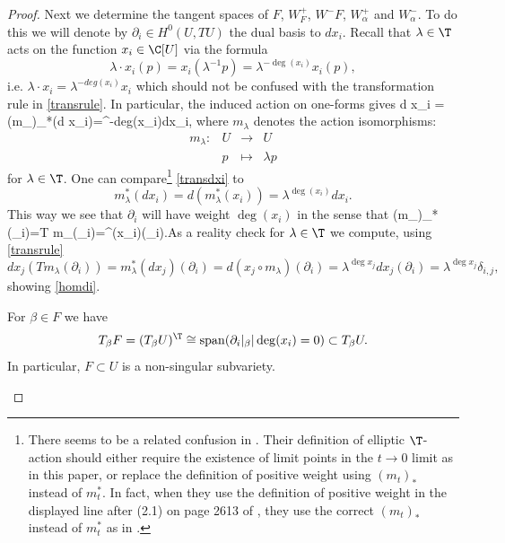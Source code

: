 \begin{proof}
	Next we determine the tangent spaces of $F$, $W^+_{F}$, $W^-{F}$, $W^+_\alpha$ and $W^-_\alpha$. To do this we will denote by $\partial_i\in H^0(U,TU)$ the dual basis to $dx_i$. Recall that  $\lambda\in \T$ acts on the function $x_i\in\C[U]$ via the formula $$\lambda\cdot x_i(p)=x_i( \lambda^{-1}p)=\lambda^{-\deg(x_i)}x_i(p),$$ i.e. $\lambda\cdot x_i=\lambda^{-deg(x_i)}x_i$ which should not be confused with the transformation rule in \eqref{transrule}.  In particular, the induced action on one-forms gives \beq\label{transdxi} \lambda\cdot d x_i =(m_\lambda)_*(d x_i)=\lambda^{-deg(x_i)}dx_i, \eeq where $m_\lambda$ denotes the action isomorphisms:  $$\begin{array}{cccc}m_\lambda: &U&\to& U\\ &p&\mapsto& \lambda p\end{array}$$ for $\lambda\in \T$. One can compare\footnote{There seems to be a related confusion in \cite[Definition 1.1]{bellamy-etal}. Their  definition of elliptic $\T$-action  should either require the existence of limit points in the $t\to 0$ limit as in this paper, or replace the definition of positive weight using $(m_t)_*$ instead of $m_t^*$. In fact, when they use the definition of positive weight in the displayed line after (2.1) on page 2613 of \cite{bellamy-etal}, they use the correct $(m_t)_*$ instead of $m_t^*$ as in   \cite[Definition 1.1]{bellamy-etal}. } \eqref{transdxi} to $$m_\lambda^*(dx_i)=d(m_\lambda^*(x_i))=\lambda^{\deg(x_i)}dx_i .$$  This way we see that $\partial_i$ will have weight $\deg(x_i)$ in the sense that \beq\label{homdi} (m_\lambda)_*(\partial_i)=T m_\lambda(\partial_i)=\lambda^{\deg(x_i)}(\partial_i).\eeq  As a reality check for $\lambda\in \T$  we compute, using \eqref{transrule} $$dx_j(T m_\lambda (\partial_i))=m_\lambda^*(dx_j)(\partial_i)=d ( x_j\circ m_\lambda)(\partial_i)=  \lambda^{\deg x_j} dx_j(\partial_i)=\lambda^{\deg x_j} \delta_{i,j},$$ showing \eqref{homdi}.
	\begin{lemma}
\notready For $\beta\in F$ we have $$T_\beta F = (T_\beta U)^\T\cong \operatorname{span}(\partial_i|_\beta|\deg(x_i)=0)\subset T_\beta U.$$ In particular, $F\subset U$ is a non-singular subvariety.
	\end{lemma}

\end{proof}
